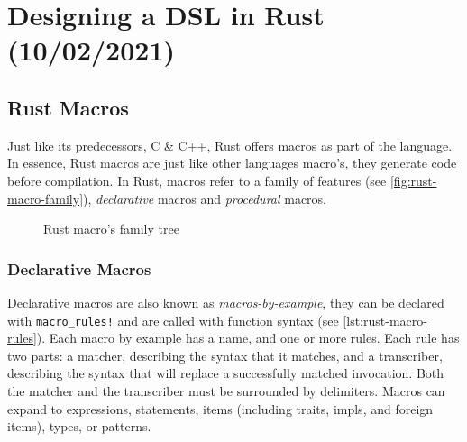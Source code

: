 \chapter{Designing a DSL in Rust (10/02/2021)}\label{cha:rust-dsl}

\section{Rust Macros}

Just like its predecessors, C \& C++, Rust offers macros as part of the language.
In essence, Rust macros are just like other languages macro's, they generate code before compilation.
In Rust, macros refer to a family of features (see \autoref{fig:rust-macro-family}),
\emph{declarative} macros and \emph{procedural} macros.

\begin{figure}
    \centering
    \caption{Rust macro's family tree}
    \label{fig:rust-macro-family}
\end{figure}

\subsection{Declarative Macros}

Declarative macros are also known as \emph{macros-by-example}, they can be declared with \texttt{macro\_rules!}
and are called with function syntax (see \autoref{lst:rust-macro-rules}).
Each macro by example has a name, and one or more rules. Each rule has two parts:
a matcher, describing the syntax that it matches, and a transcriber,
describing the syntax that will replace a successfully matched invocation.
Both the matcher and the transcriber must be surrounded by delimiters.
Macros can expand to expressions, statements, items (including traits, impls, and foreign items), types, or patterns.

